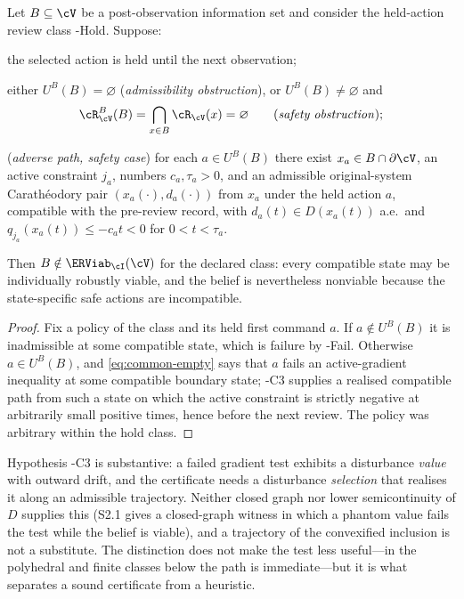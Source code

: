 \begin{theorem}\label{thm:common-action}
Let $B\subseteq\cV$ be a post-observation information set and consider the held-action review class \hyp{Hold}. Suppose:
\begin{description}[leftmargin=2.6em,itemsep=1pt]
\item[\hyp{C1}] the selected action is held until the next observation;
\item[\hyp{C2}] either $U^B(B)=\varnothing$ (\emph{admissibility obstruction}), or $U^B(B)\ne\varnothing$ and
\begin{equation}\label{eq:common-empty}
\cR^B_\cV(B)=\bigcap_{x\in B}\cR_\cV(x)=\varnothing\qquad\text{(\emph{safety obstruction})};
\end{equation}
\item[\hyp{C3}] (\emph{adverse path, safety case}) for each $a\in U^B(B)$ there exist $x_a\in B\cap\partial\cV$, an active constraint $j_a$, numbers $c_a,\tau_a>0$, and an admissible original-system Carath\'eodory pair $(x_a(\cdot),d_a(\cdot))$ from $x_a$ under the held action $a$, compatible with the pre-review record, with $d_a(t)\in D(x_a(t))$ a.e.\ and $q_{j_a}(x_a(t))\le-c_at<0$ for $0<t<\tau_a$.
\end{description}
Then $B\notin\ERViab_\cI(\cV)$ for the declared class: every compatible state may be individually robustly viable, and the belief is nevertheless nonviable because the state-specific safe actions are incompatible.
\end{theorem}

\begin{proof}
Fix a policy of the class and its held first command $a$. If $a\notin U^B(B)$ it is inadmissible at some compatible state, which is failure by \hyp{Fail}. Otherwise $a\in U^B(B)$, and \eqref{eq:common-empty} says that $a$ fails an active-gradient inequality at some compatible boundary state; \hyp{C3} supplies a realised compatible path from such a state on which the active constraint is strictly negative at arbitrarily small positive times, hence before the next review. The policy was arbitrary within the hold class.
\end{proof}

Hypothesis \hyp{C3} is substantive: a failed gradient test exhibits a disturbance \emph{value} with outward drift, and the certificate needs a disturbance \emph{selection} that realises it along an admissible trajectory. Neither closed graph nor lower semicontinuity of $D$ supplies this (S2.1 gives a closed-graph witness in which a phantom value fails the test while the belief is viable), and a trajectory of the convexified inclusion is not a substitute. The distinction does not make the test less useful---in the polyhedral and finite classes below the path is immediate---but it is what separates a sound certificate from a heuristic.

